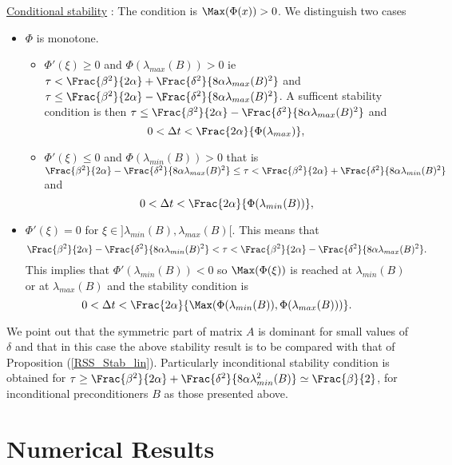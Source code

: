 {\begin{proof_amiens}
\underline{Conditional stability} : The condition is $\Max(\Phi(x)) >0$. We distinguish two cases
\begin{itemize}
\item $\Phi$ is monotone.
\begin{itemize}
\item $\Phi'(\xi) \ge 0$  and $\Phi(\lambda_{max}(B))>0$ ie
$\tau < \Frac{\beta^2}{2\alpha}+\Frac{\delta^2}{8\alpha \lambda_{max}(B)^2}$ and $\tau \le \Frac{\beta^2}{2\alpha}-\Frac{\delta^2}{8\alpha \lambda_{max}(B)^2}$. A sufficent stability condition is then $\tau \le \Frac{\beta^2}{2\alpha}-\Frac{\delta^2}{8\alpha \lambda_{max}(B)^2}$ and
$$
0<\Delta t < \Frac{2\alpha}{\Phi(\lambda_{max})},
$$
\item $\Phi'(\xi) \le 0$ and $\Phi(\lambda_{min}(B))>0$ that is $\Frac{\beta^2}{2\alpha}-\Frac{\delta^2}{8\alpha \lambda_{max}(B)^2}\le \tau < 
\Frac{\beta^2}{2\alpha}+\Frac{\delta^2}{8\alpha \lambda_{min}(B)^2}$
and
$$
0<\Delta t < \Frac{2\alpha}{\Phi(\lambda_{min}(B))},
$$
\end{itemize}
\item $\Phi'(\xi)=0$ for $\xi\in  ]\lambda_{min}(B),\lambda_{max}(B)[$. This means that
$$
\Frac{\beta^2}{2\alpha}-\Frac{\delta^2}{8\alpha \lambda_{min}(B)^2}< \tau <\Frac{\beta^2}{2\alpha}-\Frac{\delta^2}{8\alpha \lambda_{max}(B)^2}.
$$
This implies that $\Phi'(\lambda_{min}(B))<0$ so $\Max(\Phi(\xi))$ is reached at $\lambda_{min}(B)$ or at
$\lambda_{max}(B)$ and the stability condition is
$$
0<\Delta t < \Frac{2\alpha}{\Max(\Phi(\lambda_{min}(B)),\Phi(\lambda_{max}(B)))}.
$$
\end{itemize}
\end{proof_amiens}
We point out that the symmetric part of matrix $A$ is dominant for small values of $\delta$ and that in this case the above stability result is to be compared with that of Proposition (\ref{RSS_Stab_lin}). Particularly inconditional stability condition is obtained for $\tau \ge \Frac{\beta^2}{2\alpha}  +\Frac{\delta^2}{8\alpha \lambda^2_{min}(B)} \simeq  \Frac{\beta}{2}$, for inconditional preconditioners $B$ as those presented above.
\section{Numerical Results}
}
